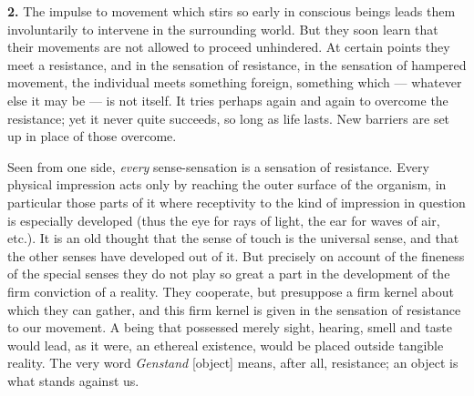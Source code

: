 \documentclass[12pt,a4paper]{book}
\begin{document}
\textbf{2.} The impulse to movement which stirs so early in conscious
beings leads them involuntarily to intervene in the surrounding world.
But they soon learn that their movements are not allowed to proceed
unhindered. At certain points they meet a resistance, and in the
sensation of resistance, in the sensation of hampered movement, the
individual meets something foreign, something which --- whatever else it
may be --- is not itself. It tries perhaps again and again to overcome
the resistance; yet it never quite succeeds, so long as life lasts. New
barriers are set up in place of those overcome.

Seen from one side, \emph{every} sense-sensation is a sensation of
resistance. Every physical impression acts only by reaching the outer
surface of the organism, in particular those parts of it where
receptivity to the kind of impression in question is especially
developed (thus the eye for rays of light, the ear for waves of air,
etc.). It is an old thought that the sense of touch is the universal
sense, and that the other senses have developed out of it. But precisely
on account of the fineness of the special senses they do not play so
great a part in the development of the firm conviction of a reality.
They cooperate, but presuppose a firm kernel about which they can
gather, and this firm kernel is given in the sensation of resistance to
our movement. A being that possessed merely sight, hearing, smell and
taste would lead, as it were, an ethereal existence, would be placed
outside tangible reality. The very word \textit{Genstand} [object] means,
after all, resistance; an object is what stands against us.
\end{document}
